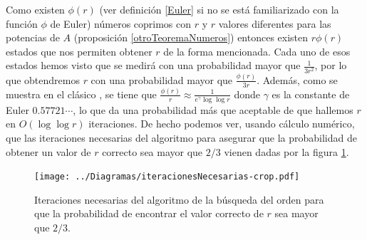 \documentclass[11pt, spanish]{report}
\numberwithin{equation}{section}
\numberwithin{defin}{section}
\begin{document}
Como existen $\phi(r)$ (ver definición \ref{Euler} si no se está familiarizado con la función $\phi$ de Euler) números coprimos con $r$ y $r$ valores diferentes para las potencias de $A$ (proposición \ref{otroTeoremaNumeros}) entonces existen $r\phi(r)$ estados que nos permiten obtener $r$ de la forma mencionada. Cada uno de esos estados hemos visto que se medirá con una probabilidad mayor que $\frac{1}{3r^2}$, por lo que obtendremos $r$ con una probabilidad mayor que $\frac{\phi(r)}{3r}$. Además, como se muestra en el clásico \cite{hardy1979introduction}, se tiene que $\frac{\phi(r)}{r}\approx \frac{1}{e^\gamma\log\log r}$ donde $\gamma$ es la constante de Euler $0.57721\cdots$, lo que da una probabilidad más que aceptable\footnotemark{} de que hallemos $r$ en $O(\log\log r)$ iteraciones. De hecho podemos ver, usando cálculo numérico, que las iteraciones necesarias del algoritmo para asegurar que la probabilidad de obtener un valor de $r$ correcto sea mayor que $2/3$ vienen dadas por la figura \ref{probs}.


\begin{figure}
\begin{center}
\texttt{[image: ../Diagramas/iteracionesNecesarias-crop.pdf]}
\end{center}
\caption{Iteraciones necesarias del algoritmo de la búsqueda del orden para que la probabilidad de encontrar el valor correcto de $r$ sea mayor que $2/3$.}\label{probs}
\end{figure}
\end{document}
